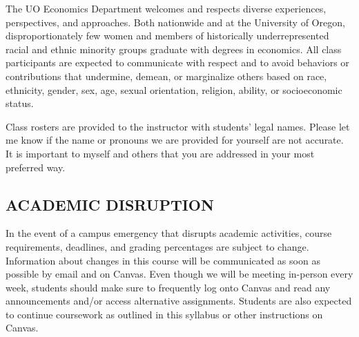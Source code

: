 \documentclass[11pt]{article}
\begin{document}
The UO Economics Department welcomes and respects diverse experiences, perspectives, and approaches. 
Both nationwide and at the University of Oregon, disproportionately few women and members of historically underrepresented racial and ethnic minority groups graduate with degrees in economics. 
All class participants are expected to communicate with respect and to avoid behaviors or contributions that undermine, demean, or marginalize others based on race, ethnicity, gender, sex, age, sexual orientation, religion, ability, or socioeconomic status.

Class rosters are provided to the instructor with students' legal names.
Please let me know if the name or pronouns we are provided for yourself are not accurate.
It is important to myself and others that you are addressed in your most preferred way.

\subsection*{ACADEMIC DISRUPTION}
In the event of a campus emergency that disrupts academic activities, course requirements, deadlines, and grading percentages are subject to change. 
Information about changes in this course will be communicated as soon as possible by email and on Canvas. 
Even though we will be meeting in-person every week, students should make sure to frequently log onto Canvas and read any announcements and/or access alternative assignments. 
Students are also expected to continue coursework as outlined in this syllabus or other instructions on Canvas. 

\newpage

%
\end{document}
